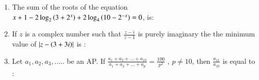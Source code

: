 \documentclass[journal]{IEEEtran}
\begin{document}
\begin{enumerate}[start=1]
\begin{enumerate}
\end{enumerate}
\item %
The sum of the roots of the equation \\ 
$x+1-2\log_2 \left(3+2^x\right)+2\log_4 \left(10-2^{-x}\right)=0$, is:
\begin{enumerate}
\end{enumerate}
\item %
If $z$ is a complex number such that $\frac{z-i}{z-1}$ is purely imaginary the the minimum value of $\left\vert z-\left(3+3i\right)\right\vert$ is :
\begin{enumerate}
\end{enumerate}
\item %
Let $a_{1},a_{2},a_{3},.....$ be an AP. If $\frac{a_{1}+a_{2}+...+a_{10}}{a_{1}+a_{2}+...+a_{p}}  = \frac{100}{p^2}$ , $p\neq 10$, then $\frac{a_{11}}{a_{10}}$ is equal to :
\begin{enumerate}
\end{enumerate}
\end{enumerate}
\end{document}
